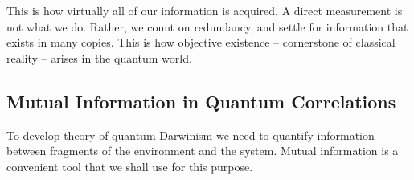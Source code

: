 \documentclass[aps,amsmath,amssymb,amsfonts,floatfix]{revtex4-1}
\newcommand{\ket}[1]    {| #1 \rangle}
\newcommand{\cS}        {{\mathcal S}}
\newcommand{\+}         {\dagger}
\newcommand\hocom[1]{}%
\begin{document}
{{This is
how virtually all of our information is acquired. A direct measurement is not what we do. Rather, we
count on redundancy, and settle for information that exists in many copies. This is how objective existence -- cornerstone of classical reality -- arises in the quantum world. 



\hocom{ The existence of redundant copies of pointer states implies that observables which do not commute with
the pointer observable are inaccessible. The simplest model of quantum Darwinism that illustrates this
is a somewhat contrived arrangement of many ($N$) target qubits that constitute subsystems
of the environment interacting via a {\it controlled not} ({\tt c-not}) with a single control qubit $\cS$. As time goes on,
consecutive target qubits become imprinted with the state of the control $\cS$:
$$(a\ket 0+ b\ket 1)\otimes \ket {0_{\varepsilon_1}} \otimes \ket {0_{\varepsilon_2}}\dots \otimes \ket {0_{\varepsilon_N}} \Longrightarrow $$
$$
(a\ket 0\otimes \ket {0_{\varepsilon_1}} \otimes \ket {0_{\varepsilon_2}} + b\ket 1\otimes \ket {1_{\varepsilon_1}} \otimes \ket {1_{\varepsilon_2}})\dots \otimes \ket {0_{\varepsilon_N}} \Longrightarrow
$$
$$
a\ket 0\otimes \ket {0_{\varepsilon_1}} \otimes \dots \otimes \ket {0_{\varepsilon_N}} + b\ket 1\otimes \ket {1_{\varepsilon_1}} \dots \otimes \ket {1_{\varepsilon_N}} \ .  $$
This simple dynamics creates multiple records of the logical basis ``pointer'' states of the system in
the environment. The existence of the preferred pointer basis that is untouched by the interaction is
essential. As we have seen earlier, this is possible -- such quantum jumps emerge from the purely
quantum core postulates (o) - (iii).}

\subsection{Mutual Information in Quantum Correlations}

To develop theory of quantum Darwinism we need to quantify information between fragments of the environment and the system.
Mutual information is a convenient tool that we shall use for this purpose.

}}
\end{document}
